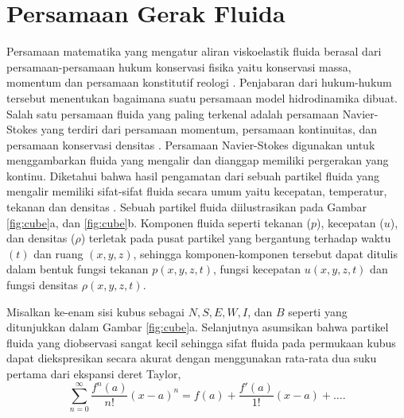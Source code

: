 \section[Persamaan Gerak Fluida]{Persamaan Gerak Fluida}
\begin{spacing}{1.5}
	
	Persamaan matematika yang mengatur aliran viskoelastik fluida berasal dari persamaan-persamaan hukum konservasi fisika yaitu konservasi massa, momentum dan persamaan konstitutif reologi . Penjabaran dari hukum-hukum tersebut menentukan bagaimana suatu persamaan model hidrodinamika dibuat. Salah satu persamaan fluida yang paling terkenal adalah persamaan Navier-Stokes yang terdiri dari persamaan momentum, persamaan kontinuitas, dan persamaan konservasi densitas . Persamaan Navier-Stokes digunakan untuk menggambarkan fluida yang mengalir dan dianggap memiliki pergerakan yang kontinu. Diketahui bahwa hasil pengamatan dari sebuah partikel fluida yang mengalir memiliki sifat-sifat fluida secara umum yaitu kecepatan, temperatur, tekanan dan densitas . Sebuah partikel fluida diilustrasikan pada Gambar \ref{fig:cube}a, dan \ref{fig:cube}b. Komponen fluida seperti tekanan ($p$), kecepatan ($u$), dan densitas ($\rho$) terletak pada pusat partikel yang bergantung terhadap waktu $(t)$ dan ruang $(x,y,z)$, sehingga komponen-komponen tersebut dapat ditulis dalam bentuk fungsi tekanan $p(x,y,z,t)$, fungsi kecepatan $u(x,y,z,t)$  dan fungsi densitas $\rho(x,y,z,t)$. 
	
	Misalkan ke-enam sisi kubus sebagai $N, S, E, W, I$, dan $B$ seperti yang ditunjukkan dalam Gambar \ref{fig:cube}a. Selanjutnya asumsikan bahwa partikel fluida yang diobservasi sangat kecil sehingga sifat fluida pada permukaan kubus dapat diekspresikan secara akurat dengan menggunakan rata-rata dua suku pertama dari ekspansi deret Taylor, 
	\begin{equation*}
		\sum_{n=0}^{\infty}\frac{f^{n}(a)}{n!}(x-a)^n = f(a)+\frac{f'(a)}{1!}(x-a)+\dots.
	\end{equation*}
 

\end{spacing}
